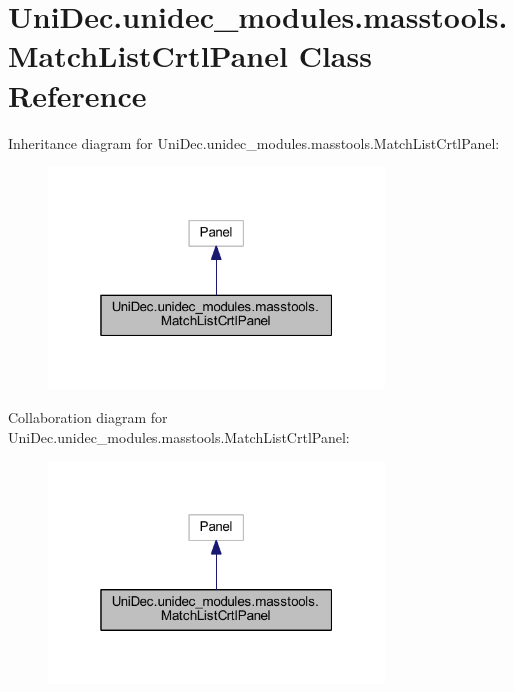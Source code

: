 \hypertarget{class_uni_dec_1_1unidec__modules_1_1masstools_1_1_match_list_crtl_panel}{}\section{Uni\+Dec.\+unidec\+\_\+modules.\+masstools.\+Match\+List\+Crtl\+Panel Class Reference}
\label{class_uni_dec_1_1unidec__modules_1_1masstools_1_1_match_list_crtl_panel}


Inheritance diagram for Uni\+Dec.\+unidec\+\_\+modules.\+masstools.\+Match\+List\+Crtl\+Panel\+:\nopagebreak
\begin{figure}[H]
\begin{center}
\leavevmode
\includegraphics[width=253pt]{class_uni_dec_1_1unidec__modules_1_1masstools_1_1_match_list_crtl_panel__inherit__graph}
\end{center}
\end{figure}


Collaboration diagram for Uni\+Dec.\+unidec\+\_\+modules.\+masstools.\+Match\+List\+Crtl\+Panel\+:\nopagebreak
\begin{figure}[H]
\begin{center}
\leavevmode
\includegraphics[width=253pt]{class_uni_dec_1_1unidec__modules_1_1masstools_1_1_match_list_crtl_panel__coll__graph}
\end{center}
\end{figure}
